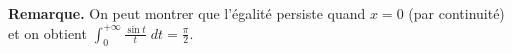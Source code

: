 {{\begin{center}
\end{center}

\textbf{Remarque.} On peut montrer que l'égalité persiste quand $x=0$ (par continuité) et on obtient $\int_{0}^{+\infty} \frac{\sin t}{t}\;dt= \frac{\pi}{2}$.
}
}
